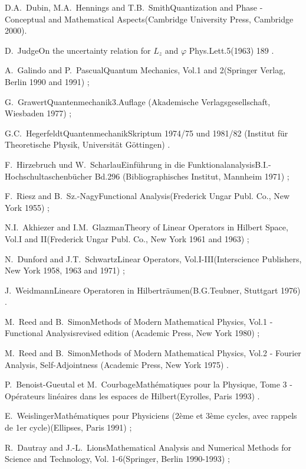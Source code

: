 \documentclass[12pt]{report}
\begin{document}
\begin{thebibliography}{22}
\bookref
{D.A.~Dubin, M.A.~Hennings and T.B.~Smith}{Quantization and Phase -
Conceptual and Mathematical Aspects}{(Cambridge University Press,
Cambridge 2000).}

\artref
{D.~Judge}{On the uncertainty relation for $L_z$ and $\varphi$}{
Phys.Lett.}{5}{(1963) 189 .}

 
\bookref
{A.~Galindo and P.~Pascual}{Quantum Mechanics, Vol.1 and 2}{(Springer
Verlag, Berlin 1990 and 1991) ;}
 
\bookref
{G.~Grawert}{Quantenmechanik}{3.Auflage
(Akademische Verlagsgesellschaft,
Wiesbaden 1977) ;}
 
\bookref
{G.C.~Hegerfeldt}{Quantenmechanik}{Skriptum
1974/75 und 1981/82 (Institut f\"ur Theoretische Physik,
Universit\"at G\"ottingen) .}
 
 
\bookref
{F.~Hirzebruch und W.~Scharlau}{Einf\"uhrung in die
Funktional\-analysis}{B.I.-Hochschultaschenb\"ucher
Bd.296 (Bibliographisches Institut,
Mannheim 1971) ;}
 
\bookref
{F.~Riesz and B.~Sz.-Nagy}{Functional Analysis}{(Frederick Ungar
Publ. Co., New York 1955) ;}
 
\bookref
{N.I.~Akhiezer and I.M.~Glazman}{Theory of Linear Operators in
Hilbert Space, Vol.I and II}{(Frederick Ungar Publ. Co., New York 1961
and 1963) ;}
 
\bookref
{N.~Dunford and J.T.~Schwartz}{Linear Operators,
Vol.I-III}{(Interscience Publishers, New York 1958, 1963 and 1971) ;}
 
\bookref
{J.~Weidmann}{Lineare Operatoren in Hilbertr\"aumen}{(B.G.Teubner,
Stuttgart 1976) .}
 

\bookref
{M.~Reed and B.~Simon}{Methods of Modern Mathematical Physics, Vol.1 -
Functional Analysis}{revised edition
(Academic Press, New York 1980) ;}
 
\bookref
{M.~Reed and B.~Simon}{Methods of Modern Mathematical Physics, Vol.2 -
Fourier Analysis, Self-Adjointness}{
(Academic Press, New York 1975) .}
 

\bookref
{P.~Benoist-Gueutal et M.~Courbage}{Math\'ematiques pour
la Physique, Tome 3 - Op\'erateurs lin\'eaires dans les espaces
de Hilbert}{(Eyrolles, Paris 1993) .}


\bookref
{E.~Weislinger}{Math\'ematiques pour Physiciens
(2\`eme et 3\`eme cycles, avec rappels de 1er
cycle)}{(Ellipses, Paris 1991) ;}
 
\bookref
{R.~Dautray and J.-L.~Lions}{Mathematical Analysis and Numerical 
Methods for Science and Technology, Vol. 1-6}{(Springer, 
Berlin 1990-1993) ;}
 

\end{thebibliography}
\end{document}
